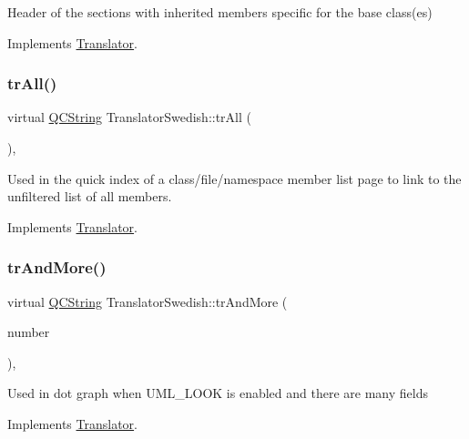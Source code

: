 Header of the sections with inherited members specific for the base class(es) 

Implements \mbox{\hyperlink{class_translator}{Translator}}.

\mbox{\label{class_translator_swedish_a5347912b8d25fd5b9c74800b4788b332}} 
\subsubsection{\texorpdfstring{trAll()}{trAll()}}
{\footnotesize\ttfamily virtual \mbox{\hyperlink{class_q_c_string}{Q\+C\+String}} Translator\+Swedish\+::tr\+All (\begin{DoxyParamCaption}{ }\end{DoxyParamCaption})\hspace{0.3cm}{\ttfamily [inline]}, {\ttfamily [virtual]}}

Used in the quick index of a class/file/namespace member list page to link to the unfiltered list of all members. 

Implements \mbox{\hyperlink{class_translator}{Translator}}.

\mbox{\label{class_translator_swedish_aec5d73fee6585b2ba03f5e710176b73d}} 
\subsubsection{\texorpdfstring{trAndMore()}{trAndMore()}}
{\footnotesize\ttfamily virtual \mbox{\hyperlink{class_q_c_string}{Q\+C\+String}} Translator\+Swedish\+::tr\+And\+More (\begin{DoxyParamCaption}\item[{const \mbox{\hyperlink{class_q_c_string}{Q\+C\+String}} \&}]{number }\end{DoxyParamCaption})\hspace{0.3cm}{\ttfamily [inline]}, {\ttfamily [virtual]}}

Used in dot graph when U\+M\+L\+\_\+\+L\+O\+OK is enabled and there are many fields 

Implements \mbox{\hyperlink{class_translator}{Translator}}.

\mbox{\label{class_translator_swedish_a717ca5ea8f7e681c1db5a1b7e8bdf4c0}} 

